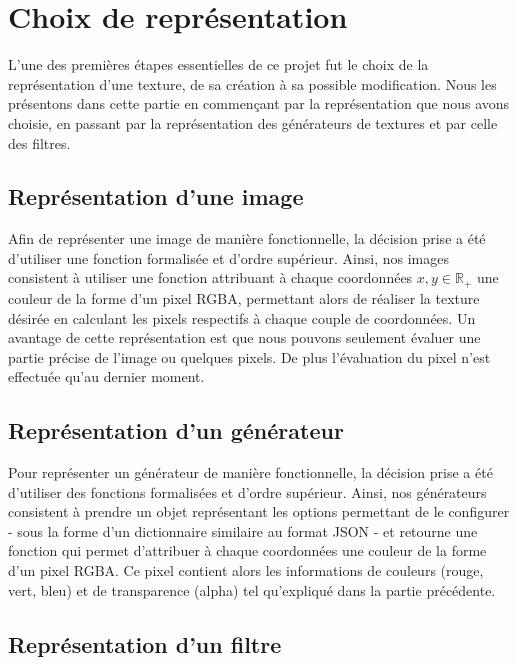 \documentclass[11pt]{article}
\begin{document}
\vspace{15mm}
\section{Choix de représentation}
\label{section:representation}
L'une des premières étapes essentielles de ce projet fut le choix de la représentation d'une texture, de sa création à sa possible modification. Nous les présentons dans cette partie en commençant par la représentation que nous avons choisie, en passant par la représentation des générateurs de textures et par celle des filtres.

\subsection{Représentation d'une image}

Afin de représenter une image de manière fonctionnelle, la décision prise a été d'utiliser une fonction formalisée et d'ordre supérieur. Ainsi, nos images consistent à utiliser une fonction attribuant à chaque coordonnées $x, y \in \mathbb{R}_{+}$ une couleur de la forme d'un pixel RGBA, permettant alors de réaliser la texture désirée en calculant les pixels respectifs à chaque couple de coordonnées. Un avantage de cette représentation est que nous pouvons seulement évaluer une partie précise de l'image ou quelques pixels. De plus l'évaluation du pixel n'est effectuée qu'au dernier moment.



\subsection{Représentation d'un générateur}

Pour représenter un générateur de manière fonctionnelle, la décision prise a été d'utiliser des fonctions formalisées et d'ordre supérieur. Ainsi, nos générateurs consistent à prendre un objet représentant les options permettant de le configurer - sous la forme d'un dictionnaire similaire au format JSON - et retourne une fonction qui permet d'attribuer à chaque coordonnées une couleur de la forme d'un pixel RGBA. Ce pixel contient alors les informations de couleurs (rouge, vert, bleu) et de transparence (alpha) tel qu'expliqué dans la partie précédente.



\subsection{Représentation d'un filtre}
\end{document}
